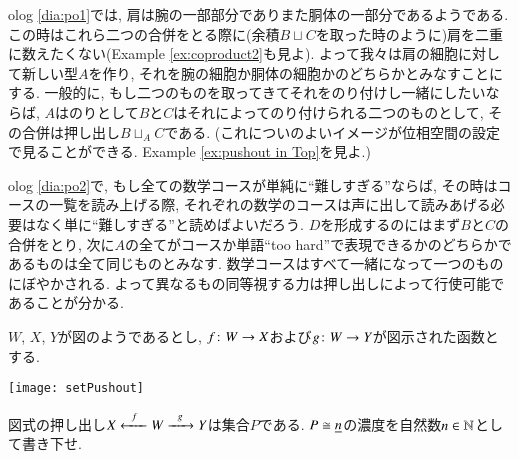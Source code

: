 \begin{example}[Pushout]

olog \eqref{dia:po1}では, 肩は腕の一部部分でありまた胴体の一部分であるようである. この時はこれら二つの合併をとる際に(余積$B\sqcup C$を取った時のように)肩を二重に数えたくない(Example \ref{ex:coproduct2}も見よ). よって我々は肩の細胞に対して新しい型$A$を作り, それを腕の細胞か胴体の細胞かのどちらかとみなすことにする. 一般的に, もし二つのものを取ってきてそれをのり付けし一緒にしたいならば, $A$はのりとして$B$と$C$はそれによってのり付けられる二つのものとして, その合併は押し出し$B\sqcup_AC$である. (これについのよいイメージが位相空間の設定で見ることができる. Example \ref{ex:pushout in Top}を見よ.)


olog \eqref{dia:po2}で, もし全ての数学コースが単純に``難しすぎる''ならば, その時はコースの一覧を読み上げる際, それぞれの数学のコースは声に出して読みあげる必要はなく単に``難しすぎる''と読めばよいだろう. $D$を形成するのにはまず$B$と$C$の合併をとり, 次に$A$の全てがコースか単語``too hard''で表現できるかのどちらかであるものは全て同じものとみなす. 数学コースはすべて一緒になって一つのものにぼやかされる. よって異なるもの同等視する力は押し出しによって行使可能であることが分かる.

\end{example}

\begin{exercise}
$W$, $X$, $Y$が図のようであるとし, $f\colon W\rightarrow X$および$g\colon W\rightarrow Y$が図示された函数とする. 
\begin{center}
\texttt{[image: setPushout]}
\end{center}
図式の押し出し$X\xleftarrow{\ \ f\ \ }W\xrightarrow{\ \ g\ \ }Y$は集合$P$である. $P\cong\underline{n}$の濃度を自然数$n\in{\mathbb N}$として書き下せ.
\end{exercise}

